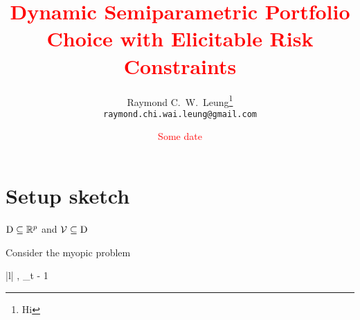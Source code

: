 \documentclass{article}
\title{\textcolor{red}{Dynamic Semiparametric Portfolio Choice with Elicitable Risk Constraints}}
\date{\textcolor{red}{Some date}}
\author{%
  Raymond C.\ W.\ Leung\thanks{Hi} \\
  \texttt{raymond.chi.wai.leung@gmail.com} 
}
\theoremstyle{plain}
\theoremstyle{remark}
\begin{document}
\maketitle


\begin{abstract}
	\lipsum[77]
\end{abstract}

\section{Setup sketch}
$\mathrm{D} \subseteq \mathbb{R}^p$ and $\mathcal{V} \subseteq \mathrm{D}$

Consider the myopic problem


\begin{maxi!}|l|
{\portfolio \in \portfoliospace, \riskmeasure \in \riskmeasureconstraints} {\E_{t - 1} \label{eq:OrangeObjFunc} }{\label{eq:OrangeOptimProb}}{}
\end{maxi!}
\end{document}
